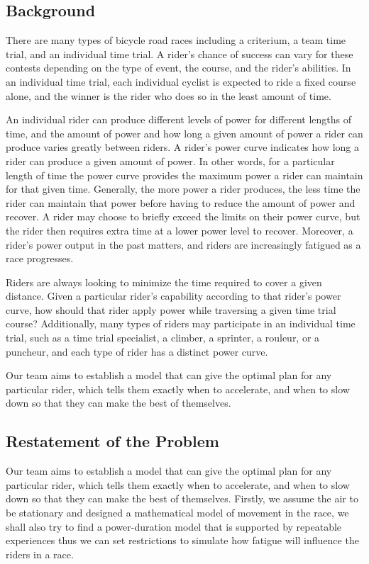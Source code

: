 \documentclass[12pt]{article}
\begin{document}
\subsection{Background}

There are many types of bicycle road races including a criterium, a team time trial, and an
individual time trial. A rider's chance of success can vary for these contests depending on the
type of event, the course, and the rider's abilities. In an individual time trial, each individual
cyclist is expected to ride a fixed course alone, and the winner is the rider who does so in the
least amount of time.

An individual rider can produce different levels of power for different lengths of time, and the
amount of power and how long a given amount of power a rider can produce varies greatly
between riders. A rider's power curve indicates how long a rider can produce a given amount of
power. In other words, for a particular length of time the power curve provides the maximum
power a rider can maintain for that given time. Generally, the more power a rider produces, the
less time the rider can maintain that power before having to reduce the amount of power and
recover. A rider may choose to briefly exceed the limits on their power curve, but the rider then
requires extra time at a lower power level to recover. Moreover, a rider's power output in the
past matters, and riders are increasingly fatigued as a race progresses.

Riders are always looking to minimize the time required to cover a given distance. Given a
particular rider's capability according to that rider's power curve, how should that rider apply
power while traversing a given time trial course? Additionally, many types of riders may
participate in an individual time trial, such as a time trial specialist, a climber, a sprinter, a
rouleur, or a puncheur, and each type of rider has a distinct power curve.

Our team aims to establish a model that can give the optimal plan for any particular rider, which tells them exactly when to accelerate,
and when to slow down so that they can make the best of themselves.
\subsection{Restatement of the Problem}
Our team aims to establish a model that can give the optimal plan for any particular rider, which tells them exactly when to accelerate,
and when to slow down so that they can make the best of themselves. Firstly, we assume the air to be stationary and designed a mathematical model of movement
in the race, we shall also try to find a power-duration model that is supported by repeatable experiences thus we can  set restrictions  to simulate how fatigue
will influence the riders in a race.
\end{document}
